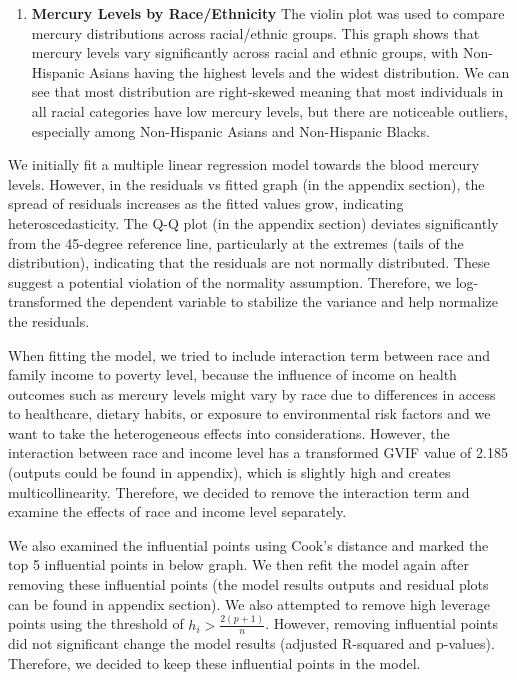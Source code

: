 \documentclass[
  letterpaper,
  DIV=11,
  numbers=noendperiod]{scrartcl}
\providecommand{\tightlist}{%
  \setlength{\itemsep}{0pt}\setlength{\parskip}{0pt}}\usepackage{longtable,booktabs,array}
\begin{document}
\begin{enumerate}
\def\labelenumi{\arabic{enumi}.}
\setcounter{enumi}{1}
\tightlist
\item
  \textbf{Mercury Levels by Race/Ethnicity} The violin plot was used to
  compare mercury distributions across racial/ethnic groups. This graph
  shows that mercury levels vary significantly across racial and ethnic
  groups, with Non-Hispanic Asians having the highest levels and the
  widest distribution. We can see that most distribution are
  right-skewed meaning that most individuals in all racial categories
  have low mercury levels, but there are noticeable outliers, especially
  among Non-Hispanic Asians and Non-Hispanic Blacks.
\end{enumerate}

We initially fit a multiple linear regression model towards the blood
mercury levels. However, in the residuals vs fitted graph (in the
appendix section), the spread of residuals increases as the fitted
values grow, indicating heteroscedasticity. The Q-Q plot (in the
appendix section) deviates significantly from the 45-degree reference
line, particularly at the extremes (tails of the distribution),
indicating that the residuals are not normally distributed. These
suggest a potential violation of the normality assumption. Therefore, we
log-transformed the dependent variable to stabilize the variance and
help normalize the residuals.

When fitting the model, we tried to include interaction term between
race and family income to poverty level, because the influence of income
on health outcomes such as mercury levels might vary by race due to
differences in access to healthcare, dietary habits, or exposure to
environmental risk factors and we want to take the heterogeneous effects
into considerations. However, the interaction between race and income
level has a transformed GVIF value of 2.185 (outputs could be found in
appendix), which is slightly high and creates multicollinearity.
Therefore, we decided to remove the interaction term and examine the
effects of race and income level separately.

We also examined the influential points using Cook's distance and marked
the top 5 influential points in below graph. We then refit the model
again after removing these influential points (the model results outputs
and residual plots can be found in appendix section). We also attempted
to remove high leverage points using the threshold of
\(h_i > \frac{2(p+1)}{n}\). However, removing influential points did not
significant change the model results (adjusted R-squared and p-values).
Therefore, we decided to keep these influential points in the model.
\end{document}
